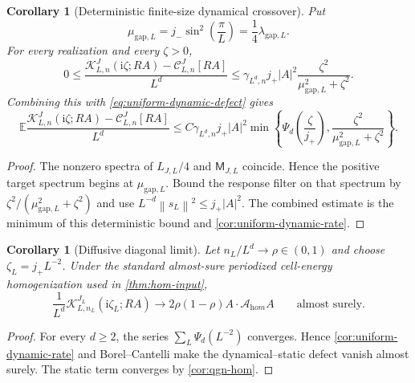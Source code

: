 \documentclass[11pt]{article}
\newtheorem{corollary}[theorem]{Corollary}
\theoremstyle{definition}
\theoremstyle{remark}
\newcommand{\I}{\mathrm i}
\newcommand{\E}{\mathbb E}
\newcommand{\cC}{\mathcal C}
\newcommand{\cK}{\mathcal K}
\newcommand{\cA}{\mathcal A}
\newcommand{\norm}[1]{\left\lVert #1\right\rVert}
\newcommand{\abs}[1]{\left\lvert #1\right\rvert}
\begin{document}
\begin{corollary}[Deterministic finite-size dynamical crossover]
\label{cor:finite-size-dynamic-crossover}
Put
\begin{equation}
 \mu_{\mathrm{gap},L}=j_-\sin^2\left(\frac{\pi}{L}\right)
 =\frac14\lambda_{\mathrm{gap},L}.
\end{equation}
For every realization and every $\zeta>0$,
\begin{equation}
 0\le
 \frac{\cK_{L,n}^{J}(\I\zeta;RA)-\cC_{L,n}^{J}[RA]}{L^d}
 \le \gamma_{L^d,n}j_+\abs{A}^2
 \frac{\zeta^2}{\mu_{\mathrm{gap},L}^2+\zeta^2}.
 \label{eq:deterministic-dynamic-crossover}
\end{equation}
Combining this with \eqref{eq:uniform-dynamic-defect} gives
\begin{equation}
 \E\frac{\cK_{L,n}^{J}(\I\zeta;RA)-\cC_{L,n}^{J}[RA]}{L^d}
 \le C\gamma_{L^d,n}j_+\abs{A}^2
 \min\left\{
 \Psi_d\left(\frac\zeta{j_+}\right),
 \frac{\zeta^2}{\mu_{\mathrm{gap},L}^2+\zeta^2}
 \right\}.
 \label{eq:combined-dynamic-crossover}
\end{equation}
\end{corollary}

\begin{proof}
The nonzero spectra of $L_{J,L}/4$ and $\mathsf M_{J,L}$ coincide.  Hence the
positive target spectrum begins at $\mu_{\mathrm{gap},L}$.  Bound the response
filter on that spectrum by
$\zeta^2/(\mu_{\mathrm{gap},L}^2+\zeta^2)$ and use
$L^{-d}\norm{s_L}^2\le j_+\abs{A}^2$.  The combined estimate is the minimum of
this deterministic bound and \cref{cor:uniform-dynamic-rate}.
\end{proof}

\begin{corollary}[Diffusive diagonal limit]
\label{cor:diffusive-diagonal}
Let $n_L/L^d\to\rho\in(0,1)$ and choose $\zeta_L=j_+L^{-2}$.  Under the standard almost-sure periodized cell-energy homogenization used in \cref{thm:hom-input},
\begin{equation}
 \frac1{L^d}\cK_{L,n_L}^{J_L}(\I\zeta_L;RA)
 \longrightarrow
 2\rho(1-\rho)A\cdot\cA_{\mathrm hom}A
 \qquad\text{almost surely.}
 \label{eq:diffusive-diagonal-limit}
\end{equation}
\end{corollary}

\begin{proof}
For every $d\ge2$, the series
$\sum_L\Psi_d(L^{-2})$ converges.  Hence \cref{cor:uniform-dynamic-rate} and Borel--Cantelli make the dynamical--static defect vanish almost surely.  The static term converges by \cref{cor:qgn-hom}.
\end{proof}
\end{document}
